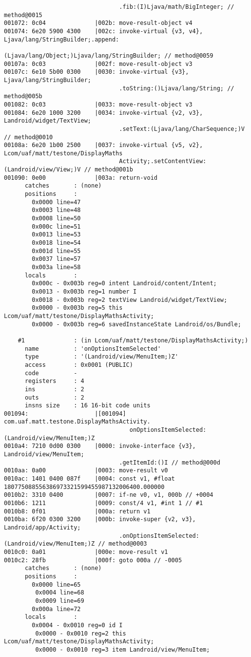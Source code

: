 \begin{lstlisting}
                                 .fib:(I)Ljava/math/BigInteger; // method@0015
001072: 0c04              |002b: move-result-object v4
001074: 6e20 5900 4300    |002c: invoke-virtual {v3, v4}, Ljava/lang/StringBuilder;.append:
                                 (Ljava/lang/Object;)Ljava/lang/StringBuilder; // method@0059
00107a: 0c03              |002f: move-result-object v3
00107c: 6e10 5b00 0300    |0030: invoke-virtual {v3}, Ljava/lang/StringBuilder;
                                 .toString:()Ljava/lang/String; // method@005b
001082: 0c03              |0033: move-result-object v3
001084: 6e20 1000 3200    |0034: invoke-virtual {v2, v3}, Landroid/widget/TextView;
                                 .setText:(Ljava/lang/CharSequence;)V // method@0010
00108a: 6e20 1b00 2500    |0037: invoke-virtual {v5, v2}, Lcom/uaf/matt/testone/DisplayMaths
                                 Activity;.setContentView:(Landroid/view/View;)V // method@001b
001090: 0e00              |003a: return-void
      catches       : (none)
      positions     :
        0x0000 line=47
        0x0003 line=48
        0x0008 line=50
        0x000c line=51
        0x0013 line=53
        0x0018 line=54
        0x001d line=55
        0x0037 line=57
        0x003a line=58
      locals        :
        0x000c - 0x003b reg=0 intent Landroid/content/Intent;
        0x0013 - 0x003b reg=1 number I
        0x0018 - 0x003b reg=2 textView Landroid/widget/TextView;
        0x0000 - 0x003b reg=5 this Lcom/uaf/matt/testone/DisplayMathsActivity;
        0x0000 - 0x003b reg=6 savedInstanceState Landroid/os/Bundle;

    #1              : (in Lcom/uaf/matt/testone/DisplayMathsActivity;)
      name          : 'onOptionsItemSelected'
      type          : '(Landroid/view/MenuItem;)Z'
      access        : 0x0001 (PUBLIC)
      code          -
      registers     : 4
      ins           : 2
      outs          : 2
      insns size    : 16 16-bit code units
001094:                   |[001094] com.uaf.matt.testone.DisplayMathsActivity.
                                    onOptionsItemSelected:(Landroid/view/MenuItem;)Z
0010a4: 7210 0d00 0300    |0000: invoke-interface {v3}, Landroid/view/MenuItem;
                                 .getItemId:()I // method@000d
0010aa: 0a00              |0003: move-result v0
0010ac: 1401 0400 087f    |0004: const v1, #float 180775088556386973321599455987132006400.000000
0010b2: 3310 0400         |0007: if-ne v0, v1, 000b // +0004
0010b6: 1211              |0009: const/4 v1, #int 1 // #1
0010b8: 0f01              |000a: return v1
0010ba: 6f20 0300 3200    |000b: invoke-super {v2, v3}, Landroid/app/Activity;
                                 .onOptionsItemSelected:(Landroid/view/MenuItem;)Z // method@0003
0010c0: 0a01              |000e: move-result v1
0010c2: 28fb              |000f: goto 000a // -0005
      catches       : (none)
      positions     :
        0x0000 line=65
         0x0004 line=68
         0x0009 line=69
        0x000a line=72
      locals        :
        0x0004 - 0x0010 reg=0 id I
         0x0000 - 0x0010 reg=2 this Lcom/uaf/matt/testone/DisplayMathsActivity;
         0x0000 - 0x0010 reg=3 item Landroid/view/MenuItem;


\end{lstlisting}
